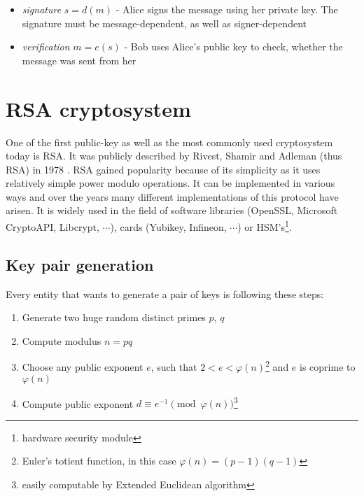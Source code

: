 \begin{itemize}

\item \textit{signature} $s = d(m)$ - Alice signs the message using her private key. The signature must be message-dependent, as well as signer-dependent

\item \textit{verification} $m = e(s)$ - Bob uses Alice’s public key to check, whether the message was sent from her

\end{itemize}

\section{RSA cryptosystem}

One of the first public-key as well as the most commonly used cryptosystem today is RSA. It was publicly described by Rivest, Shamir and Adleman (thus RSA) in 1978 \cite{rsa_paper}. RSA gained popularity because of its simplicity as it uses relatively simple power modulo operations. It can be implemented in various ways and over the years many different implementations of this protocol have arisen. It is widely used in the field of software libraries (OpenSSL, Microsoft CryptoAPI, Libcrypt, $\cdots$), cards (Yubikey, Infineon, $\cdots$) or HSM's\footnote{hardware security module}.


\subsection*{Key pair generation}

Every entity that wants to generate a pair of keys is following these steps:

\begin{enumerate}

\item Generate two huge random distinct primes $p$, $q$
\item Compute modulus $n = pq$
\item Choose any public exponent $e$, such that $2 < e < \varphi(n)$\footnote{Euler's totient function, in this case $\varphi(n) = (p-1)(q-1)$} and $e$ is coprime to $\varphi(n)$
\item Compute public exponent $d \equiv e^{-1} \pmod{\varphi(n)}$\footnote{easily computable by Extended Euclidean algorithm}

\end{enumerate}

